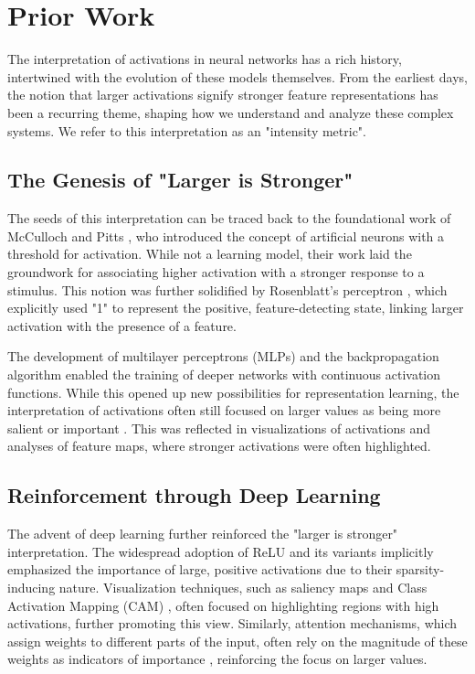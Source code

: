 \section{Prior Work}

The interpretation of activations in neural networks has a rich history, intertwined with the evolution of these models themselves. From the earliest days, the notion that larger activations signify stronger feature representations has been a recurring theme, shaping how we understand and analyze these complex systems. We refer to this interpretation as an "intensity metric".

\subsection{The Genesis of "Larger is Stronger"}

The seeds of this interpretation can be traced back to the foundational work of McCulloch and Pitts \cite{mcculloch1943logical}, who introduced the concept of artificial neurons with a threshold for activation. While not a learning model, their work laid the groundwork for associating higher activation with a stronger response to a stimulus. This notion was further solidified by Rosenblatt's perceptron \cite{rosenblatt1958perceptron}, which explicitly used "1" to represent the positive, feature-detecting state, linking larger activation with the presence of a feature.

The development of multilayer perceptrons (MLPs) and the backpropagation algorithm \cite{rumelhart1986learning} enabled the training of deeper networks with continuous activation functions. While this opened up new possibilities for representation learning, the interpretation of activations often still focused on larger values as being more salient or important \cite{erhan2009visualizing, lecun1998gradient}. This was reflected in visualizations of activations and analyses of feature maps, where stronger activations were often highlighted.

\subsection{Reinforcement through Deep Learning}

The advent of deep learning further reinforced the "larger is stronger" interpretation. The widespread adoption of ReLU and its variants \cite{nair2010rectified, glorot2011deep, krizhevsky2012imagenet} implicitly emphasized the importance of large, positive activations due to their sparsity-inducing nature. Visualization techniques, such as saliency maps \cite{simonyan2013deep} and Class Activation Mapping (CAM) \cite{zhou2016learning}, often focused on highlighting regions with high activations, further promoting this view.  Similarly, attention mechanisms, which assign weights to different parts of the input, often rely on the magnitude of these weights as indicators of importance \cite{bahdanau2014neural, vaswani2017attention}, reinforcing the focus on larger values.

